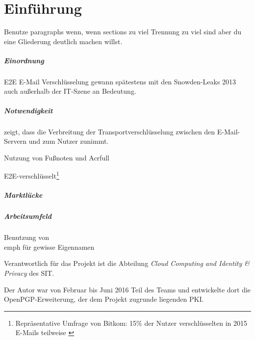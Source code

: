 \chapter{Einführung}

\begin{formal}
Benutze paragraphs wenn, wenn sections zu viel Trennung zu viel sind aber du eine Gliederung deutlich machen willst. 
\end{formal}

\paragraph{Einordnung}
\gls{E2E} E-Mail Verschlüsselung gewann spätestens mit den
Snowden-Leaks 2013 auch außerhalb der IT-Szene an Bedeutung. %

\paragraph{Notwendigkeit }
\cite{googleemailsectrends} zeigt, dass die Verbreitung der Transportverschlüsselung zwischen den E-Mail-Servern und zum Nutzer zunimmt.

\begin{formal}
	Nutzung von Fußnoten und Acrfull
\end{formal}
\acrfull{E2E}-verschlüsselt\footnote{Repräsentative Umfrage von Bitkom: 15\% der Nutzer verschlüsselten in 2015 E-Mails teilweise \cite{bitkom-emailcrypto-langsam}}



\paragraph{Marktlücke}
\blindtext[1]

\paragraph{Arbeitsumfeld}
\begin{formal}
	Benutzung von \\emph für gewisse Eigennamen
\end{formal}
Verantwortlich für das Projekt ist die Abteilung \emph{Cloud Computing and Identity \& Privacy} des SIT.

Der Autor war von Februar bis Juni 2016 Teil des Teams und entwickelte dort die OpenPGP-Erweiterung, der dem Projekt zugrunde liegenden PKI.